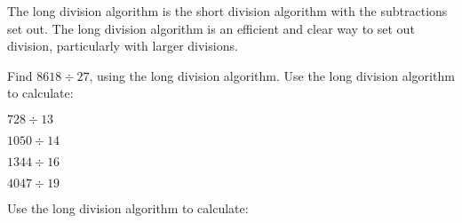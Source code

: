 The long division algorithm is the short division algorithm with the subtractions set out. The long division algorithm is an efficient and clear way to set out division, particularly with larger divisions.

\quad{}\quad{}\quad{}

\begin{exercises}
    \begin{questions}
        \Question[1] Find \(8618 \div 27\), using the long division algorithm.
        \Question[] Use the long division algorithm to calculate:
        \begin{parts}
            \Part[1] \(728 \div 13\)
            \begin{solutionorbox}[1in]
            \end{solutionorbox}
            \Part[1] \(1050 \div 14\)
            \begin{solutionorbox}[1in]
            \end{solutionorbox}
            \Part[1] \(1344 \div 16\)
            \begin{solutionorbox}[1in]
            \end{solutionorbox}
            \Part[1] \(4047 \div 19\)
            \begin{solutionorbox}[1in]
            \end{solutionorbox}
        \end{parts}
        \Question[4] Use the long division algorithm to calculate:
\end{questions}
\end{exercises}
